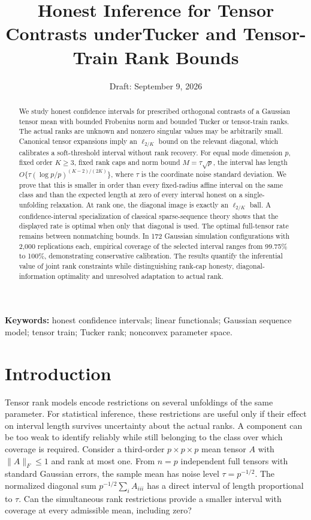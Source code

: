 \documentclass[11pt]{article}
\title{Honest Inference for Tensor Contrasts under\newline Tucker and Tensor-Train Rank Bounds}
\author{}
\date{Draft: September 9, 2026}
\theoremstyle{remark}
\newcommand{\norm}[1]{\lVert #1\rVert}
\begin{document}
\maketitle

\begin{abstract}
We study honest confidence intervals for prescribed orthogonal contrasts of a Gaussian tensor mean with bounded Frobenius norm and bounded Tucker or tensor-train ranks. The actual ranks are unknown and nonzero singular values may be arbitrarily small. Canonical tensor expansions imply an $\ell_{2/K}$ bound on the relevant diagonal, which calibrates a soft-threshold interval without rank recovery. For equal mode dimension $p$, fixed order $K\ge3$, fixed rank caps and norm bound $M=\tau\sqrt p$, the interval has length $O\{\tau(\log p/p)^{(K-2)/(2K)}\}$, where $\tau$ is the coordinate noise standard deviation. We prove that this is smaller in order than every fixed-radius affine interval on the same class and than the expected length at zero of every interval honest on a single-unfolding relaxation. At rank one, the diagonal image is exactly an $\ell_{2/K}$ ball. A confidence-interval specialization of classical sparse-sequence theory shows that the displayed rate is optimal when only that diagonal is used. The optimal full-tensor rate remains between nonmatching bounds. In 172 Gaussian simulation configurations with 2,000 replications each, empirical coverage of the selected interval ranges from 99.75\% to 100\%, demonstrating conservative calibration. The results quantify the inferential value of joint rank constraints while distinguishing rank-cap honesty, diagonal-information optimality and unresolved adaptation to actual rank.
\end{abstract}

\noindent\textbf{Keywords:} honest confidence intervals; linear functionals; Gaussian sequence model; tensor train; Tucker rank; nonconvex parameter space.

\section{Introduction}\label{sec:intro}

Tensor rank models encode restrictions on several unfoldings of the same parameter. For statistical inference, these restrictions are useful only if their effect on interval length survives uncertainty about the actual ranks. A component can be too weak to identify reliably while still belonging to the class over which coverage is required. Consider a third-order $p\times p\times p$ mean tensor $A$ with $\norm A_F\le1$ and rank at most one. From $n=p$ independent full tensors with standard Gaussian errors, the sample mean has noise level $\tau=p^{-1/2}$. The normalized diagonal sum $p^{-1/2}\sum_i A_{iii}$ has a direct interval of length proportional to $\tau$. Can the simultaneous rank restrictions provide a smaller interval with coverage at every admissible mean, including zero?
\end{document}
